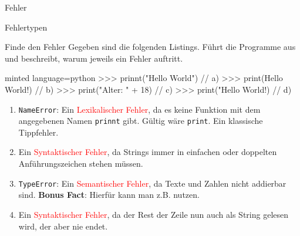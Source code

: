 \begin{task}[points=auto]{Fehler}
\begin{subtask*}[points=0]{Fehlertypen }
\begin{solution}
        \end{solution}
    \end{subtask*}
    \begin{subtask*}[points=0]{Finde den Fehler }
        Gegeben sind die folgenden Listings.
        Führt die Programme aus und beschreibt, warum jeweils ein Fehler auftritt.
        \begin{codeBlock}[]{minted language=python}
            >>> prinnt("Hello World")  // a)
            >>> print(Hello World!)    // b)
            >>> print("Alter: " + 18)  // c)
            >>> print("Hello World!)   // d)
        \end{codeBlock}
        \begin{solution}
            \begin{enumerate}
                \item \texttt{NameError}: Ein \textcolor{red}{Lexikalischer Fehler}, da es keine Funktion mit dem angegebenen Namen
                    \texttt{prinnt} gibt.
                    Gültig wäre \texttt{print}.
                    Ein klassische Tippfehler.
                \item Ein \textcolor{red}{Syntaktischer Fehler},
                    da Strings immer in einfachen oder doppelten Anführungszeichen stehen müssen.
                \item \texttt{TypeError}: Ein \textcolor{red}{Semantischer Fehler}, da Texte und Zahlen nicht addierbar sind.
                    \textbf{Bonus Fact}: Hierfür kann man z.B.  nutzen.
                \item Ein \textcolor{red}{Syntaktischer Fehler}, da der Rest der Zeile nun auch als String gelesen wird, der aber nie endet.
            \end{enumerate}

        \end{solution}
    \end{subtask*}
\end{task}

